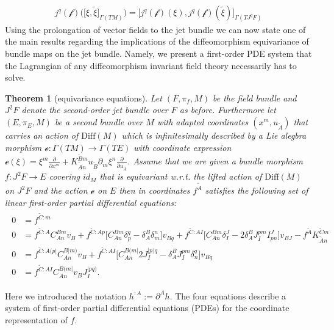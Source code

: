 \documentclass[a4paper,12pt, DIV=14, BCOR=5mm, twoside, headsepline, numbers=noenddot]{scrbook}
\newtheorem{theorem}{Theorem}[section]
\begin{document}
\begin{align}
j^q (\mathcal{f})\bigl (  \bigl [\xi, \tilde{\xi}  \bigr ]_{\Gamma(TM)}\bigr) =  \bigl [ j^q(\mathcal{f})(\xi), j^q(\mathcal{f})(\tilde{\xi}) \bigr ]_{\Gamma(TJ^qF)}
\end{align}
Using the prolongation of vector fields to the jet bundle we can now state one of the main results regarding the implications of the diffeomorphism equivariance of bundle maps on the jet bundle. Namely, we present a first-order PDE system that the Lagrangian of any diffeomorphism invariant field theory necessarily has to solve. 
\begin{theorem}[equivariance equations]
Let $(F,\pi_f,M)$ be the field bundle and $J^2F$ denote the second-order jet bundle over $F$ as before. Furthermore let $(E, \pi_E, M)$ be a second bundle over $M$ with adapted coordinates $(x^m, u_{\tilde{A}})$ that carries an action of $\mathrm{Diff}(M)$ which is infinitesimally described by a Lie alegbra morphism $\mathcal{e}: \Gamma(TM) \rightarrow \Gamma(TE)$ with coordinate expression $\mathcal{e}(\xi) = \xi^m \frac{\partial}{\partial x^m} + K_{\tilde{A}n}^{\tilde{B}m} u_{\tilde{B}} \partial_m \xi^n \frac{\partial}{\partial u_{\tilde{A}}}$. Assume that we are given a bundle morphism $f : J^2F \rightarrow E$ covering $id_M$ that is equivariant w.r.t. the lifted action of $\mathrm{Diff}(M)$ on $J^2F$ and the action $\mathcal{e}$ on $E$ then in coordinates $f^{\tilde{A}}$ satisfies the following set of linear first-order partial differential equations:
\begin{align}
\begin{aligned}
    0 &= f^{\tilde{C}:m} \\
    0 &= f^{\tilde{C}:A} C_{An}^{Bm} v_B + f^{\tilde{C}:Ap} \bigl[ C_{An}^{Bm} \delta_p^q - \delta_A^B \delta_m^n \bigr] v_{Bq} + f^{\tilde{C}:AI} \bigl[ C_{An}^{Bm} \delta_I^J - 2 \delta_A^B J_I^{pm} I^J_{pn}  \bigr] v_{BJ} - f^{\tilde{A}}K_{\tilde{A}n}^{\tilde{C}m}\\
    0 &= f^{\tilde{C}:A(p\vert}C_{An}^{B \vert m)} v_B + f^{\tilde{C}: AI} \bigl[ C_{An}^{B(m\vert} 2 J_I^{\vert p) q} - \delta^B_A J_I ^{pm} \delta_n^q \bigr] v_{Bq} \\
    0 &= f^{\tilde{C}:AI} C_{An}^{B(m\vert} v_B J_I^{\vert p q )}.
\end{aligned}
\end{align}
\end{theorem}
Here we introduced the notation $h^{:A} := \partial^A h$. The four equations describe a system of first-order partial differential equations (PDEs) for the coordinate representation of $f$. 
\end{document}
